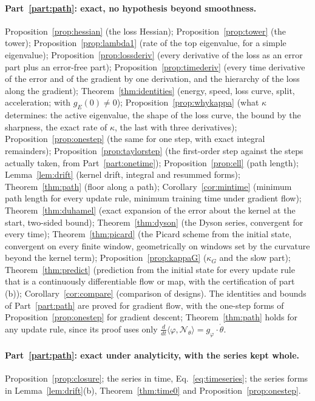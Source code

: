 \documentclass[11pt]{article}
\theoremstyle{definition}
\theoremstyle{remark}
\newcommand{\Net}{\mathcal{N}_\theta}    %
\newcommand{\ip}[2]{\langle #1,#2\rangle}
\begin{document}
\paragraph{Part~\ref{part:path}: exact, no hypothesis beyond smoothness.}
Proposition~\ref{prop:hessian} (the loss Hessian); Proposition~\ref{prop:tower} (the tower); Proposition~\ref{prop:lambda1} (rate of the top eigenvalue, for a simple eigenvalue); Proposition~\ref{prop:lossderiv} (every derivative of the loss as an error part plus an error-free part); Proposition~\ref{prop:timederiv} (every time derivative of the error and of the gradient by one derivation, and the hierarchy of the loss along the gradient); Theorem~\ref{thm:identities} (energy, speed, loss curve, split, acceleration; with $g_E(0)\neq0$); Proposition~\ref{prop:whykappa} (what $\kappa$ determines: the active eigenvalue, the shape of the loss curve, the bound by the sharpness, the exact rate of $\kappa$, the last with three derivatives); Proposition~\ref{prop:onestep} (the same for one step, with exact integral remainders); Proposition~\ref{prop:taylorstep} (the first-order step against the steps actually taken, from Part~\ref{part:onetime}); Proposition~\ref{prop:ell} (path length); Lemma~\ref{lem:drift} (kernel drift, integral and resummed forms); Theorem~\ref{thm:path} (floor along a path); Corollary~\ref{cor:mintime} (minimum path length for every update rule, minimum training time under gradient flow); Theorem~\ref{thm:duhamel} (exact expansion of the error about the kernel at the start, two-sided bound); Theorem~\ref{thm:dyson} (the Dyson series, convergent for every time); Theorem~\ref{thm:picard} (the Picard scheme from the initial state, convergent on every finite window, geometrically on windows set by the curvature beyond the kernel term); Proposition~\ref{prop:kappaG} ($\kappa_G$ and the slow part); Theorem~\ref{thm:predict} (prediction from the initial state for every update rule that is a continuously differentiable flow or map, with the certification of part (b)); Corollary~\ref{cor:compare} (comparison of designs).
The identities and bounds of Part~\ref{part:path} are proved for gradient flow, with the one-step forms of Proposition~\ref{prop:onestep} for gradient descent; Theorem~\ref{thm:path} holds for any update rule, since its proof uses only $\frac{d}{dt}\ip{\varphi}{\Net} = g_\varphi\cdot\dot\theta$.

\paragraph{Part~\ref{part:path}: exact under analyticity, with the series kept whole.}
Proposition~\ref{prop:closure}; the series in time, Eq.~\eqref{eq:timeseries}; the series forms in Lemma~\ref{lem:drift}(b), Theorem~\ref{thm:time0} and Proposition~\ref{prop:onestep}.
\end{document}
